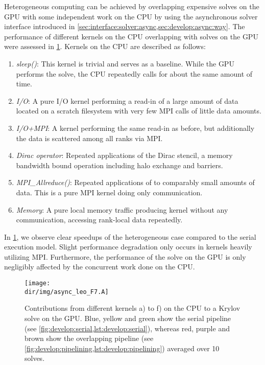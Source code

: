 Heterogeneous computing can be achieved by overlapping expensive solves on the GPU with some independent work on the CPU by using the asynchronous solver interface introduced in \cref{sec:interface:solver:async,sec:develop:async:way}.
The performance of different kernels on the CPU overlapping with solves on the GPU were assessed in \cref{fig:async:F7:leo:bar}.
Kernels on the CPU are described as follows:
\begin{enumerate}[label=\alph*)]
    \item \emph{sleep()}: This kernel is trivial and serves as a baseline. While the GPU performs the solve, the CPU repeatedly calls  for about the same amount of time.
    \item \emph{I/O}: A pure I/O kernel performing a read-in of a large amount of data located on a scratch filesystem with very few MPI calls of little data amounts.
    \item \emph{I/O+MPI}: A kernel performing the same read-in as before, but additionally the data is scattered among all ranks via MPI.
    \item \emph{Dirac operator}: Repeated applications of the Dirac stencil, a memory bandwidth bound operation including halo exchange and barriers.
    \item \emph{MPI\_Allreduce()}: Repeated applications of  to comparably small amounts of data. This is a pure MPI kernel doing only communication.
    \item \emph{Memory}: A pure local memory traffic producing kernel without any communication, accessing rank-local data repeatedly.
\end{enumerate}

In \cref{fig:async:F7:leo:bar}, we observe clear speedups of the heterogeneous case compared to the serial execution model.
Slight performance degradation only occurs in kernels heavily utilizing MPI.
Furthermore, the performance of the solve on the GPU is only negligibly affected by the concurrent work done on the CPU.
\begin{figure}
    \centering
    \texttt{[image: \\dir/img/async\_leo\_F7.A]}
    \caption{Contributions from different kernels a) to f) on the CPU to a Krylov solve on the GPU. Blue, yellow and green show the serial pipeline (see \cref{fig:develop:serial,lst:develop:serial}), whereas red, purple and brown show the overlapping pipeline (see \cref{fig:develop:pipelining,lst:develop:pipelining}) averaged over \num{10} solves. }
    \label{fig:async:F7:leo:bar}
\end{figure}

